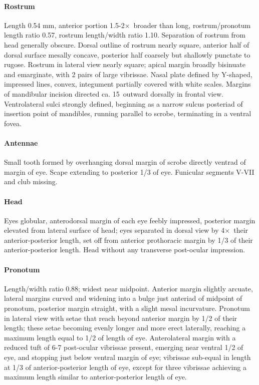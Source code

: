 \documentclass[fleqn,10pt,lineno]{wlpeerj} %
\newcommand{\td}{\textdegree~}
\newcommand{\x}{$\times$~}
\begin{document}
			\paragraph{Rostrum}
				Length 0.54 mm, anterior portion 1.5-2\x broader than long, rostrum/pronotum length ratio 0.57, rostrum length/width ratio 1.10.
				Separation of rostrum from head generally obscure. 
				Dorsal outline of rostrum nearly square, anterior half of dorsal surface mesally concave, posterior half coarsely but shallowly punctate to rugose. 
				Rostrum in lateral view nearly square; apical margin broadly bisinuate and emarginate, with 2 pairs of large vibrissae. 
				Nasal plate defined by Y-shaped, impressed lines, convex, integument partially covered with white scales.
				Margins of mandibular incision directed ca. 15\td outward dorsally in frontal view. 
				Ventrolateral sulci strongly defined, beginning as a narrow sulcus posteriad of insertion point of mandibles, running parallel to scrobe, terminating in a ventral fovea.
			\paragraph{Antennae}
				Small tooth formed by overhanging dorsal margin of scrobe directly ventrad of margin of eye.
				Scape extending to posterior 1/3 of eye.
				Funicular segments V-VII and club missing.
			\paragraph{Head}
				Eyes globular, anterodorsal margin of each eye feebly impressed, posterior margin elevated from lateral surface of head; eyes separated in dorsal view by 4\x their anterior-posterior length, set off from anterior prothoracic margin by 1/3 of their anterior-posterior length. 
				Head without any transverse post-ocular impression.
			\paragraph{Pronotum}
				Length/width ratio 0.88; widest near midpoint. 
				Anterior margin slightly arcuate, lateral margins curved and widening into a bulge just anteriad of midpoint of pronotum, posterior margin straight, with a slight mesal incurvature. 
				Pronotum in lateral view with setae that reach beyond anterior margin by 1/2 of their length; these setae becoming evenly longer and more erect laterally, reaching a maximum length equal to 1/2 of length of eye. 
				Anterolateral margin with a reduced tuft of 6-7 post-ocular vibrissae present, emerging near ventral 1/2 of eye, and stopping just below ventral margin of eye; vibrissae sub-equal in length at 1/3 of anterior-posterior length of eye, except for three vibrissae achieving a maximum length similar to anterior-posterior length of eye.
\end{document}

